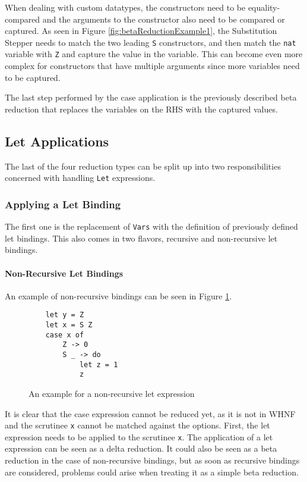 When dealing with custom datatypes,
the constructors need to be equality-compared and the arguments to the constructor also need to be compared or captured.
As seen in Figure \ref*{fig:betaReductionExample1},
the Substitution Stepper needs to match the two leading \texttt{S} constructors,
and then match the \texttt{nat} variable with \texttt{Z} and capture the value in the variable.
This can become even more complex for constructors that have multiple arguments since more variables need to be captured.

The last step performed by the case application is the previously described beta reduction that replaces the variables on the RHS with the captured values.

\subsection{Let Applications}
The last of the four reduction types can be split up into two responsibilities concerned with handling \texttt{Let} expressions.

\subsubsection{Applying a Let Binding}
The first one is the replacement of \texttt{Vars} with the definition of previously defined let bindings.
This also comes in two flavors, recursive and non-recursive let bindings.

\paragraph*{Non-Recursive Let Bindings}
An example of non-recursive bindings can be seen in Figure \ref*{fig:nonRecLetExample}.

\begin{figure}[!ht]
\begin{verbatim}
    let y = Z
    let x = S Z
    case x of
        Z -> 0
        S _ -> do
            let z = 1
            z
\end{verbatim}
    \caption{An example for a non-recursive let expression}
    \label{fig:nonRecLetExample}
\end{figure}

It is clear that the case expression cannot be reduced yet,
as it is not in WHNF and the scrutinee \texttt{x} cannot be matched against the options.
First, the let expression needs to be applied to the scrutinee \texttt{x}.
The application of a let expression can be seen as a delta reduction.
It could also be seen as a beta reduction in the case of non-recursive bindings,
but as soon as recursive bindings are considered, problems could arise when treating it as a simple beta reduction.


